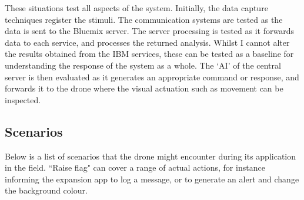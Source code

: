 \documentclass{article}
\begin{document}
These situations test all aspects of the system. Initially, the data capture techniques register the stimuli. The communication systems are tested as the data is sent to the Bluemix server. The server processing is tested as it forwards data to each service, and processes the returned analysis. Whilst I cannot alter the results obtained from the IBM services, these can be tested as a baseline for understanding the response of the system as a whole. The `AI' of the central server is then evaluated as it generates an appropriate command or response, and forwards it to the drone where the visual actuation such as movement can be inspected.


\subsection{Scenarios}
Below is a list of scenarios that the drone might encounter during its application in the field. ``Raise flag" can cover a range of actual actions, for instance informing the expansion app to log a message, or to generate an alert and change the background colour.  \\
\end{document}
